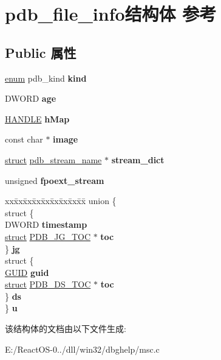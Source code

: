 \hypertarget{structpdb__file__info}{}\section{pdb\+\_\+file\+\_\+info结构体 参考}
\label{structpdb__file__info}
\subsection*{Public 属性}
\begin{DoxyCompactItemize}
\item 
\mbox{\label{structpdb__file__info_af47595bd2ca0b31c3d8ac3c547dc2b66}} 
\hyperlink{interfaceenum}{enum} pdb\+\_\+kind {\bfseries kind}
\item 
\mbox{\label{structpdb__file__info_a4c4ebb7d1a1ca271dc17cbbfe225d8e5}} 
D\+W\+O\+RD {\bfseries age}
\item 
\mbox{\label{structpdb__file__info_ae0c00bde0e7b0334500267e0d5b600b3}} 
\hyperlink{interfacevoid}{H\+A\+N\+D\+LE} {\bfseries h\+Map}
\item 
\mbox{\label{structpdb__file__info_a3c93a0f1b7fdbdd07f100c4ea7ef6ebb}} 
const char $\ast$ {\bfseries image}
\item 
\mbox{\label{structpdb__file__info_a0f06809bc047bade4efeee7b61ed76dd}} 
\hyperlink{interfacestruct}{struct} \hyperlink{structpdb__stream__name}{pdb\+\_\+stream\+\_\+name} $\ast$ {\bfseries stream\+\_\+dict}
\item 
\mbox{\label{structpdb__file__info_a96bad4770cb8ae46d7751704e8c481db}} 
unsigned {\bfseries fpoext\+\_\+stream}
\item 
\mbox{\label{structpdb__file__info_a75470d4735226b9c78235e5b38b255f5}} 
\begin{tabbing}
xx\=xx\=xx\=xx\=xx\=xx\=xx\=xx\=xx\=\kill
union \{\\
\>struct \{\\
\>\>DWORD {\bfseries timestamp}\\
\>\>\hyperlink{interfacestruct}{struct} \hyperlink{struct_p_d_b___j_g___t_o_c}{PDB\_JG\_TOC} $\ast$ {\bfseries toc}\\
\>\} {\bfseries jg}\\
\>struct \{\\
\>\>\hyperlink{interface_g_u_i_d}{GUID} {\bfseries guid}\\
\>\>\hyperlink{interfacestruct}{struct} \hyperlink{struct_p_d_b___d_s___t_o_c}{PDB\_DS\_TOC} $\ast$ {\bfseries toc}\\
\>\} {\bfseries ds}\\
\} {\bfseries u}\\

\end{tabbing}\end{DoxyCompactItemize}


该结构体的文档由以下文件生成\+:\begin{DoxyCompactItemize}
\item 
E\+:/\+React\+O\+S-\/0../dll/win32/dbghelp/msc.\+c\end{DoxyCompactItemize}
